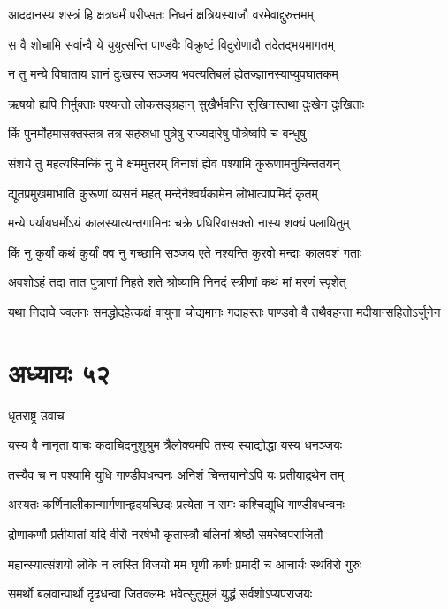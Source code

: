 \twolineshloka
{आददानस्य शस्त्रं हि क्षत्रधर्मं परीप्सतः}
{निधनं क्षत्रियस्याजौ वरमेवाद्दुरुत्तमम्}


\twolineshloka
{स वै शोचामि सर्वान्वै ये युयुत्सन्ति पाण्डवैः}
{विक्रुष्टं विदुरोणादौ तदेतद्भयमागतम्}


\twolineshloka
{न तु मन्ये विघाताय ज्ञानं दुःखस्य सञ्जय}
{भवत्यतिबलं ह्येतज्ज्ञानस्याप्युपघातकम्}


\twolineshloka
{ऋषयो ह्यपि निर्मुक्ताः पश्यन्तो लोकसङ्ग्रहान्}
{सुखैर्भवन्ति सुखिनस्तथा दुःखेन दुःखिताः}


\twolineshloka
{किं पुनर्मोहमासक्तस्तत्र तत्र सहस्रधा}
{पुत्रेषु राज्यदारेषु पौत्रेष्वपि च बन्धुषु}


\twolineshloka
{संशये तु महत्यस्मिन्किं नु मे क्षममुत्तरम्}
{विनाशं ह्येव पश्यामि कुरूणामनुचिन्ततयन्}


\twolineshloka
{द्यूतप्रमुखमाभाति कुरूणां व्यसनं महत्}
{मन्देनैश्वर्यकामेन लोभात्पापमिदं कृतम्}


\twolineshloka
{मन्ये पर्यायधर्मोऽयं कालस्यात्यन्तगामिनः}
{चक्रे प्रधिरिवासक्तो नास्य शक्यं पलायितुम्}


\twolineshloka
{किं नु कुर्यां कथं कुर्यां क्व नु गच्छामि सञ्जय}
{एते नश्यन्ति कुरवो मन्दाः कालवशं गताः}


\twolineshloka
{अवशोऽहं तदा तात पुत्राणां निहते शते}
{श्रोष्यामि निनदं स्त्रीणां कथं मां मरणं स्पृशेत्}


\twolineshloka
{यथा निदाघे ज्वलनः समद्धोदहेत्कक्षं वायुना चोद्यमानः}
{गदाहस्तः पाण्डवो वै तथैवहन्ता मदीयान्सहितोऽर्जुनेन}


\chapter{अध्यायः ५२}
\twolineshloka
{धृतराष्ट्र उवाच}
{}


\twolineshloka
{यस्य वै नानृता वाचः कदाचिदनुशुश्रुम}
{त्रैलोक्यमपि तस्य स्याद्योद्धा यस्य धनञ्जयः}


\twolineshloka
{तस्यैव च न पश्यामि युधि गाण्डीवधन्वनः}
{अनिशं चिन्तयानोऽपि यः प्रतीयाद्रथेन तम्}


\twolineshloka
{अस्यतः कर्णिनालीकान्मार्गणान्हृदयच्छिदः}
{प्रत्येता न समः कश्चिद्युधि गाण्डीवधन्वनः}


\twolineshloka
{द्रोणाकर्णौ प्रतीयातां यदि वीरौ नरर्षभौ}
{कृतास्त्रौ बलिनां श्रेष्ठौ समरेष्वपराजितौ}


\twolineshloka
{महान्स्यात्संशयो लोके न त्वस्ति विजयो मम}
{घृणी कर्णः प्रमादी च आचार्यः स्थविरो गुरुः}


\twolineshloka
{समर्थो बलवान्पार्थो दृढधन्वा जितक्लमः}
{भवेत्सुतुमुलं युद्धं सर्वशोऽप्यपराजयः}


